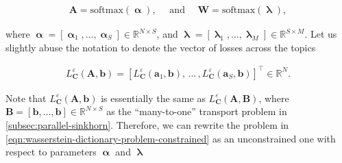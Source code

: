\begin{equation}
  \begin{aligned}
    \mathbf{A} = \text{softmax} \left(\boldsymbol\upalpha\right),
    \quad\text{ and }\quad
    \mathbf{W} = \text{softmax} \left(\boldsymbol\uplambda\right),
  \end{aligned}
\end{equation}

where $\boldsymbol\upalpha = \left[\boldsymbol\upalpha_1, \ldots, \boldsymbol\upalpha_S\right] \in \mathbb{R}^{N\times S}$,
and $\boldsymbol\uplambda = \left[\boldsymbol\uplambda_1, \ldots, \boldsymbol\uplambda_M\right] \in \mathbb{R}^{S\times M}$.
Let us slightly abuse the notation to denote the vector of losses across the topics

\begin{equation*}
  \begin{aligned}
    L_{\mathbf{C}}^\varepsilon \left(\mathbf{A}, \mathbf{b}\right)
    = \left[
      L_{\mathbf{C}}^\varepsilon \left(\mathbf{a}_1, \mathbf{b}\right),
      \,\ldots\,,
      L_{\mathbf{C}}^\varepsilon \left(\mathbf{a}_S, \mathbf{b}\right)
      \right]^\top \in \mathbb{R}^N.
  \end{aligned}
\end{equation*}

Note that $L_{\mathbf{C}}^\varepsilon \left(\mathbf{A}, \mathbf{b}\right)$
is essentially the same as $L_{\mathbf{C}}^\varepsilon \left(\mathbf{A}, \mathbf{B}\right)$,
where $\mathbf{B} = \left[\mathbf{b}, \ldots, \mathbf{b}\right] \in \mathbb{R}^{N\times S}$
as the ``many-to-one'' transport problem in \cref{subsec:parallel-sinkhorn}.
Therefore, we can rewrite the problem in \cref{eqn:wasserstein-dictionary-problem-constrained} as
an unconstrained one with respect to parameters $\boldsymbol\upalpha$ and $\boldsymbol\uplambda$

